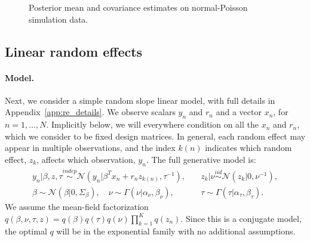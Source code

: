 \documentclass{article}\usepackage[]{graphicx}\usepackage[]{color}
\newenvironment{knitrout}{}{} %
\newcommand{\app}[1]{Appendix~\ref{app:#1}}
\newcommand{\gauss}{\mathcal{N}} %
\newcommand{\iid}{\stackrel{iid}{\sim}}
\newcommand{\indep}{\stackrel{indep}{\sim}}
\begin{document}
\begin{knitrout}
\begin{figure}[ht!]
{}

\caption[Posterior mean and covariance estimates on normal-Poisson simulation data]{Posterior mean and covariance estimates on normal-Poisson simulation data.}\label{fig:PN_SimulationResults}
\end{figure}


\end{knitrout}


\subsection{Linear random effects} \label{sec:random_effects_model}



\newcommand{\ren}{300}
\newcommand{\rensims}{100}
\newcommand{\rerenum}{30}
\newcommand{\reNuPriorAlpha}{2}
\newcommand{\reNuPriorGamma}{2}
\newcommand{\reTauPriorAlpha}{2}
\newcommand{\reTauPriorGamma}{2}
\newcommand{\reBetaPriorInfo}{0.1}
\newcommand{\reZSD}{0.4}
\newcommand{\remcmciters}{}


\paragraph{Model.}

Next, we consider a simple random slope linear model, with full details in
\app{re_details}. We observe scalars $y_n$ and $r_n$ and a vector $x_n$, for
$n=1,...,N$. Implicitly below, we will everywhere condition on all the $x_n$ and
$r_n$, which we consider to be fixed design matrices. In general, each random
effect may appear in multiple observations, and the index $k(n)$ indicates which
random effect, $z_k$, affects which observation, $y_n$.  The full generative
model is:
%
\begin{align*} y_n \vert \beta, z, \tau \indep \gauss\left(y_n \vert
\beta^T x_n + r_n z_{k(n)}, \tau^{-1}\right), &\quad z_k \vert \nu \iid
\gauss\left(z_k \vert 0, \nu^{-1}\right), \\ \beta \sim \gauss(\beta \vert 0,
\Sigma_\beta), \quad \nu \sim \Gamma(\nu \vert \alpha_\nu, \beta_\nu), &\quad
\tau \sim \Gamma(\tau \vert \alpha_\tau, \beta_\tau). \end{align*}
%
We assume the mean-field factorization $q\left(\beta,\nu,\tau,z\right) =
q\left(\beta\right) q\left(\tau\right) q\left(\nu\right) \prod_{k=1}^{K}
q\left(z_n\right)$.  Since this is a conjugate model, the optimal $q$ will be in
the exponential family with no additional assumptions.
\end{document}
